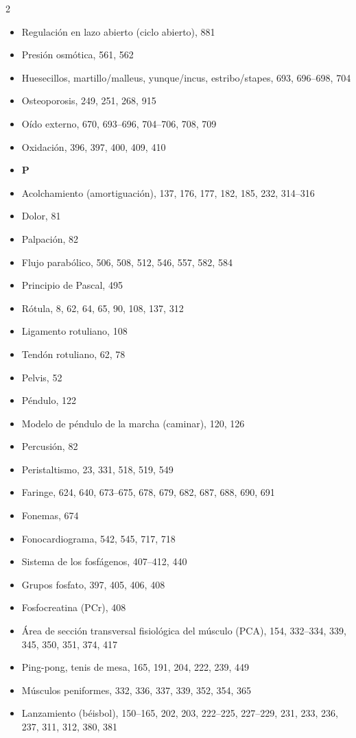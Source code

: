 \documentclass[12pt,a4paper]{book}
\begin{document}
\begin{multicols}{2}
\begin{itemize}[leftmargin=*]
  \item Regulación en lazo abierto (ciclo abierto), 881
  \item Presión osmótica, 561, 562
  \item Huesecillos, martillo/malleus, yunque/incus, estribo/stapes, 693, 696--698, 704
  \item Osteoporosis, 249, 251, 268, 915
  \item Oído externo, 670, 693--696, 704--706, 708, 709
  \item Oxidación, 396, 397, 400, 409, 410
  \item \textbf{P}
  \item Acolchamiento (amortiguación), 137, 176, 177, 182, 185, 232, 314--316
  \item Dolor, 81
  \item Palpación, 82
  \item Flujo parabólico, 506, 508, 512, 546, 557, 582, 584
  \item Principio de Pascal, 495
  \item Rótula, 8, 62, 64, 65, 90, 108, 137, 312
  \item Ligamento rotuliano, 108
  \item Tendón rotuliano, 62, 78
  \item Pelvis, 52
  \item Péndulo, 122
  \item Modelo de péndulo de la marcha (caminar), 120, 126
  \item Percusión, 82
  \item Peristaltismo, 23, 331, 518, 519, 549
  \item Faringe, 624, 640, 673--675, 678, 679, 682, 687, 688, 690, 691
  \item Fonemas, 674
  \item Fonocardiograma, 542, 545, 717, 718
  \item Sistema de los fosfágenos, 407--412, 440
  \item Grupos fosfato, 397, 405, 406, 408
  \item Fosfocreatina (PCr), 408
  \item Área de sección transversal fisiológica del músculo (PCA), 154, 332--334, 339, 345, 350, 351, 374, 417
  \item Ping-pong, tenis de mesa, 165, 191, 204, 222, 239, 449
  \item Músculos peniformes, 332, 336, 337, 339, 352, 354, 365
  \item Lanzamiento (béisbol), 150--165, 202, 203, 222--225, 227--229, 231, 233, 236, 237, 311, 312, 380, 381

\end{itemize}
\end{multicols}
\end{document}
